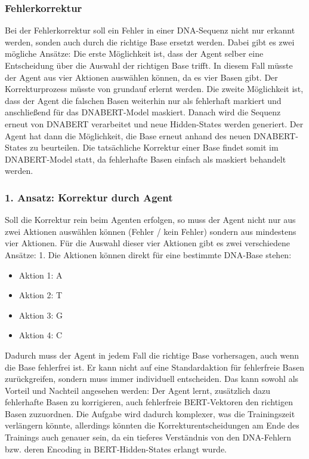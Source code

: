 \documentclass[oneside,bibliography=totocnumbered,BCOR=5mm]{scrbook}%
\theoremstyle{definition}
\theoremstyle{definition}
\theoremstyle{definition}
\theoremstyle{definition}
\theoremstyle{definition}
\theoremstyle{definition}
\begin{document}
\subsubsection{Fehlerkorrektur}
Bei der Fehlerkorrektur soll ein Fehler in einer DNA-Sequenz nicht nur erkannt werden, sonden auch durch die richtige Base ersetzt werden.
Dabei gibt es zwei mögliche Ansätze: 
Die erste Möglichkeit ist, dass der Agent selber eine Entscheidung über die Auswahl der richtigen Base trifft. 
In diesem Fall müsste der Agent aus vier Aktionen auswählen können, da es vier Basen gibt. 
Der Korrekturprozess müsste von grundauf erlernt werden.
Die zweite Möglichkeit ist, dass der Agent die falschen Basen weiterhin nur als fehlerhaft markiert
und anschließend für das DNABERT-Model maskiert. 
Danach wird die Sequenz erneut von DNABERT verarbeitet
und neue Hidden-States werden generiert. Der Agent hat dann die Möglichkeit,
die Base erneut anhand des neuen DNABERT-States zu beurteilen. 
Die tatsächliche Korrektur einer Base findet somit im DNABERT-Model statt, da fehlerhafte
Basen einfach als maskiert behandelt werden.\\

\subsubsection{1. Ansatz: Korrektur durch Agent}
Soll die Korrektur rein beim Agenten erfolgen, so muss der Agent nicht nur aus zwei Aktionen 
auswählen können (Fehler / kein Fehler) sondern aus mindestens vier Aktionen. 
Für die Auswahl dieser vier Aktionen gibt es zwei verschiedene Ansätze:
1. Die Aktionen können direkt für eine bestimmte DNA-Base stehen:\\

\begin{itemize}
  \item Aktion 1: A
  \item Aktion 2: T
  \item Aktion 3: G
  \item Aktion 4: C
\end{itemize}

Dadurch muss der Agent in jedem Fall die richtige Base vorhersagen, auch wenn die Base fehlerfrei ist.
Er kann nicht auf eine Standardaktion für fehlerfreie Basen zurückgreifen, sondern muss immer individuell entscheiden.
Das kann sowohl als Vorteil und Nachteil angesehen werden: 
Der Agent lernt, zusätzlich dazu fehlerhafte Basen zu korrigieren,
auch fehlerfreie BERT-Vektoren den richtigen Basen zuzuordnen.
Die Aufgabe wird dadurch komplexer, was die Trainingszeit verlängern könnte, allerdings könnten die Korrekturentscheidungen
am Ende des Trainings auch genauer sein, da ein tieferes Verständnis von den DNA-Fehlern bzw. deren Encoding in BERT-Hidden-States erlangt wurde.\\
\end{document}
